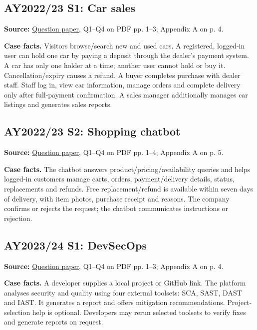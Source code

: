 \begin{studycolumns}
\subsection*{AY2022/23 S1: Car sales}\label{paper-2223-s1}
\textbf{Source:} \href{run:/Users/bryangoh/Work/ntu-cs/sc2006/pyps/SC2006\_AY2223\_S1\_Questions.pdf}{Question paper}, Q1--Q4 on PDF pp. 1--3; Appendix A on p. 4.

\textbf{Case facts.} Visitors browse/\allowbreak{}search new and used cars. A registered, logged-in user can hold one car by paying a deposit through the dealer's payment system. A car has only one holder at a time; another user cannot hold or buy it. Cancellation/\allowbreak{}expiry causes a refund. A buyer completes purchase with dealer staff. Staff log in, view car information, manage orders and complete delivery only after full-payment confirmation. A sales manager additionally manages car listings and generates sales reports.
\subsection*{AY2022/23 S2: Shopping chatbot}\label{paper-2223-s2}
\textbf{Source:} \href{run:/Users/bryangoh/Work/ntu-cs/sc2006/pyps/SC2006\_AY2223\_S2\_Questions.pdf}{Question paper}, Q1--Q4 on PDF pp. 1--4; Appendix A on p. 5.

\textbf{Case facts.} The chatbot answers product/\allowbreak{}pricing/\allowbreak{}availability queries and helps logged-in customers manage carts, orders, payment/\allowbreak{}delivery details, status, replacements and refunds. Free replacement/\allowbreak{}refund is available within seven days of delivery, with item photos, purchase receipt and reasons. The company confirms or rejects the request; the chatbot communicates instructions or rejection.
\subsection*{AY2023/24 S1: DevSecOps}\label{paper-2324-s1}
\textbf{Source:} \href{run:/Users/bryangoh/Work/ntu-cs/sc2006/pyps/SC2006\_AY2324\_S1\_Questions.pdf}{Question paper}, Q1--Q4 on PDF pp. 1--3; Appendix A on p. 4.

\textbf{Case facts.} A developer supplies a local project or GitHub link. The platform analyses security and quality using four external toolsets: SCA, SAST, DAST and IAST. It generates a report and offers mitigation recommendations. Project-selection help is optional. Developers may rerun selected toolsets to verify fixes and generate reports on request.

\end{studycolumns}
